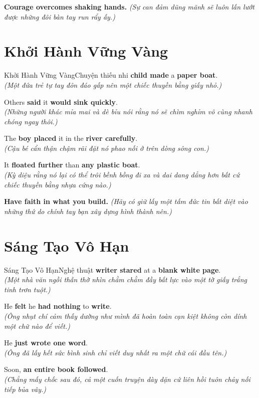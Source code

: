 \begin{baihoc}
  \textbf{Courage overcomes shaking hands.} \textit{(Sự can đảm dũng mãnh sẽ luôn lấn lướt được những đôi bàn tay run rẩy ấy.)}
\end{baihoc}

\vspace{0.8cm}

\ngayDay{}
\section{Khởi Hành Vững Vàng}
\begin{truyen}{Khởi Hành Vững Vàng}{Chuyện thiếu nhi}
 \textbf{child made} a \textbf{paper boat}.\\
\textit{(Một đứa trẻ tự tay đôn đáo gấp nên một chiếc thuyền bằng giấy nhỏ.)}

Others \textbf{said} it \textbf{would sink quickly}.\\
\textit{(Những người khác mỉa mai và dè bỉu nói rằng nó sẽ chìm nghỉm vô cùng nhanh chóng ngay thôi.)}

The \textbf{boy placed} it in the \textbf{river carefully}.\\
\textit{(Cậu bé cẩn thận chậm rãi đặt nó phao nối ở trên dòng sông con.)}

It \textbf{floated further} than \textbf{any plastic boat}.\\
\textit{(Kỳ diệu rằng nó lại có thể trôi bềnh bồng đi xa và dai dang dẳng hơn bất cứ chiếc thuyền bằng nhựa cứng nào.)}
\end{truyen}

\begin{baihoc}
  \textbf{Have faith in what you build.} \textit{(Hãy có giữ lấy một tấm đức tin bất diệt vào những thứ do chính tay bạn xây dựng hình thành nên.)}
\end{baihoc}

\vspace{0.8cm}

\ngayDay{}
\section{Sáng Tạo Vô Hạn}
\begin{truyen}{Sáng Tạo Vô Hạn}{Nghệ thuật}
 \textbf{writer stared} at a \textbf{blank white page}.\\
\textit{(Một nhà văn ngồi thẫn thờ nhìn chằm chằm đầy bất lực vào một tờ giấy trắng tinh trơn tuột.)}

He \textbf{felt} he \textbf{had nothing} to \textbf{write}.\\
\textit{(Ông nhụt chí cảm thấy dường như mình đã hoàn toàn cạn kiệt không còn dính một chữ nào để viết.)}

He \textbf{just wrote one word}.\\
\textit{(Ông đã lấy hết sức bình sinh chỉ viết duy nhất ra một chữ cái đầu tên.)}

Soon, \textbf{an entire book followed}.\\
\textit{(Chẳng mấy chốc sau đó, cả một cuốn truyện dày dặn cứ liên hồi tuôn chảy nối tiếp bủa vây.)}
\end{truyen}

